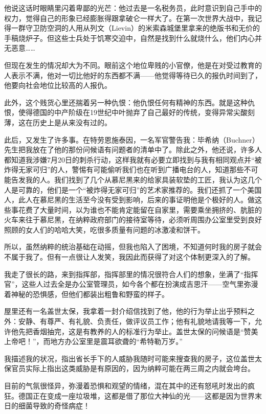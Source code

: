 \documentclass[UTF8]{ctexart}
\begin{document}
他说这话时眼睛里闪着卑鄙的光芒：他过去是一名税务员，此时意识到自己手中的权力，觉得自己的形象已经膨胀得跟拿破仑一样大了。在第一次世界大战中，我记得一群守卫防空洞的人用从列文（Lievin）的米索森城堡里拿来的绝版书和无价的手稿烧炉子。但这些士兵处于饥寒交迫中，自然是找到什么就烧什么，他们内心并无恶意……

但现在发生的情况却大为不同。眼前这个地位卑贱的小官僚，他是在对受过教育的人表示不满，他对一切比他好的东西都不满——他觉得等待已久的报仇时间到了，他要向社会地位比较高的人报仇。

此外，这个贱货心里还揣着另一种仇恨：他仇恨任何有精神的东西。就是这种仇恨，使得德国的中产阶级在19世纪中叶抛弃了自己最好的传统，变得异常尖酸刻薄，这在历史上是从来没有过的。

此后，又发生了许多事。在特劳恩施泰因，一名军官警告我：毕希纳（Buchner）先生把我放在了他的那份问候语有问题者的清单中了。除此之外，他还说，许多人都知道我涉嫌7月20日的刺杀行动，这样我就有必要立即找到与我有相同观点并“被炸得无家可归”的人，警惕有可能偷听我们也在听到广播电台的人，知道那些不可能告发我的人。我们找到了几个从慕尼黑来的给家具装软垫的工匠，我认为这几个人是可靠的，他们是一个“被炸得无家可归”的艺术家推荐的。我们还抓了一个美国人，此人在慕尼黑的生活至今没有受到影响，后来的事证明他是个极好的人。做这些事花费了大量时间，以为谁也不能肯定能留在自家里，需要乘坐拥挤的、肮脏的火车来往于慕尼黑，在纳粹政府部门的接待室等待，必须听周围办公室里受到良好照顾的女人们的哈哈大笑，吃很多质量有问题的冰激凌和饼干。

所以，虽然纳粹的统治基础在动摇，但我也陷入了困境，不知道何时我的房子就会不属于我了。但有一点很让人发笑，我因此而获得了对这个体制更深入的了解。

我走了很长的路，来到指挥部，指挥部里的情况很符合人们的想象，坐满了“指挥官”，这些人过去全是办公室管理员，如今各个都在扮演成吉思汗——空气里弥漫着神秘的恐惧感，但他们都装出粗鲁和野蛮的样子。

屋里还有一名盖世太保，我拿着一封介绍信找到了他，他的行为举止出乎预料之外：安静、有尊严、有礼貌、负责任，做评议员工作；他有礼貌地请我等一下，允许他先把香烟抽完，这是有教养的人的标准行为举止。盖世太保的问候语是“赞美上帝吧！”，而地方办公室里是震耳欲聋的“希特勒万岁。”

我描述我的状况，指出省长手下的人威胁我随时可能来搜查我的房子，这位盖世太保官员实际上指出这类威胁是有原因的，因为纳粹可能在两三周之内就会垮台。

目前的气氛很怪异，弥漫着恐惧和观望的情绪，混在其中的还有怒吼时发出的疯狂。德国正在变成一座垃圾堆，这都是借了那位大神仙的光——这都是因为世界末日的细菌导致的奇怪病症！
\end{document}
